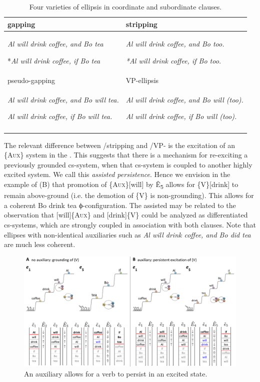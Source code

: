   
  
\begin{table}
\begin{tabularx}{\textwidth}{XX}
\lsptoprule
{gapping} & {stripping}\\
\midrule 

\textit{Al will drink coffee, and Bo tea}

*\textit{Al will drink coffee, if Bo tea} & \textit{Al will drink coffee, and Bo too.}

\textit{*Al will drink coffee, if Bo too.}  \\
\midrule
{pseudo-gapping} & {VP-ellipsis}\\
\midrule 
\textit{Al will drink coffee, and Bo will tea.}

\textit{Al will drink coffee, if Bo will tea.} & \textit{Al will drink coffee, and Bo will (too).}

\textit{Al will drink coffee, if Bo will (too).}\\
\lspbottomrule
\end{tabularx}
\caption{Four varieties of ellipsis in coordinate and subordinate clauses.}\label{tab:7:1}
\end{table}

  The relevant difference between /stripping and /VP- is the excitation of an \{A\textsc{ux}\} system in the . This suggests that there is a mechanism for re-exciting a previously grounded cs-system, when that cs-system is coupled to another highly excited system. We call this \textit{assisted persistence}. Hence we envision in the  example of {}(B) that promotion of \{A\textsc{ux}\}[will] by Ê\textsubscript{5} allows for \{V\}[drink] to remain above-ground (i.e. the demotion of \{V\} is non-grounding). This allows for a coherent {\textbar}Bo drink tea{\textbar} ϕ-con\-fig\-u\-ra\-tion. The assisted  may be related to the observation that [will]\{A\textsc{ux}\} and [drink]\{V\} could be analyzed as differentiated cs-systems, which are strongly coupled in association with both clauses. Note that ellipses with non-identical auxiliaries such as \textit{Al will drink coffee, and Bo did tea} are much less coherent.

  
\begin{figure}
\includegraphics[width=\textwidth]{figures/Tilsen-img147.png}
\caption{An auxiliary allows for a verb to persist in an excited state.}
\label{fig:7:3}
\end{figure}
 

